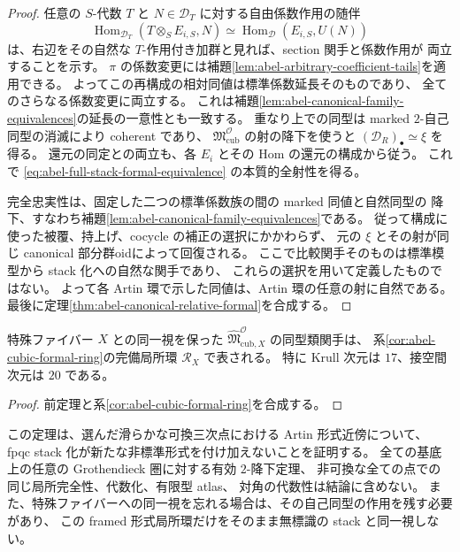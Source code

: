 \begin{proof}
任意の $S$-代数 $T$ と $N\in\mathcal D_T$ に対する自由係数作用の随伴
\[
 \operatorname{Hom}_{\mathcal D_T}(T\otimes_S E_{i,S},N)
 \simeq\operatorname{Hom}_{\mathcal D}(E_{i,S},U(N))
\]
は、右辺をその自然な $T$-作用付き加群と見れば、section 関手と係数作用が
両立することを示す。
$\pi$ の係数変更には補題\ref{lem:abel-arbitrary-coefficient-tails}を適用できる。
よってこの再構成の相対同値は標準係数延長そのものであり、
全てのさらなる係数変更に両立する。
これは補題\ref{lem:abel-canonical-family-equivalences}の延長の一意性とも一致する。
重なり上での同型は marked $2$-自己同型の消滅により coherent であり、
$\mathfrak M^{\mathcal O}_{\mathrm{cub}}$ の射の降下を使うと
$(\mathcal D_R)_\bullet\simeq\xi$ を得る。
還元の同定との両立も、各 $E_i$ とその Hom の還元の構成から従う。
これで \eqref{eq:abel-full-stack-formal-equivalence} の本質的全射性を得る。

完全忠実性は、固定した二つの標準係数族の間の marked 同値と自然同型の
降下、すなわち補題\ref{lem:abel-canonical-family-equivalences}である。
従って構成に使った被覆、持上げ、cocycle の補正の選択にかかわらず、
元の $\xi$ とその射が同じ canonical 部分群oidによって回復される。
ここで比較関手そのものは標準模型から stack 化への自然な関手であり、
これらの選択を用いて定義したものではない。
よって各 Artin 環で示した同値は、Artin 環の任意の射に自然である。
最後に定理\ref{thm:abel-canonical-relative-formal}を合成する。
\end{proof}

\begin{corollary}
\label{cor:abel-full-stack-formal-ring}
特殊ファイバー $X$ との同一視を保った
$\widehat{\mathfrak M}^{\mathcal O}_{\mathrm{cub},X}$ の同型類関手は、
系\ref{cor:abel-cubic-formal-ring}の完備局所環 $\mathcal R_X$ で表される。
特に Krull 次元は $17$、接空間次元は $20$ である。
\end{corollary}
\begin{proof}
前定理と系\ref{cor:abel-cubic-formal-ring}を合成する。
\end{proof}

\begin{remark}[主張の境界]
この定理は、選んだ滑らかな可換三次点における Artin 形式近傍について、
fpqc stack 化が新たな非標準形式を付け加えないことを証明する。
全ての基底上の任意の Grothendieck 圏に対する有効 $2$-降下定理、
非可換な全ての点での同じ局所完全性、代数化、有限型 atlas、
対角の代数性は結論に含めない。
また、特殊ファイバーへの同一視を忘れる場合は、その自己同型の作用を残す必要があり、
この framed 形式局所環だけをそのまま無標識の stack と同一視しない。
\end{remark}


